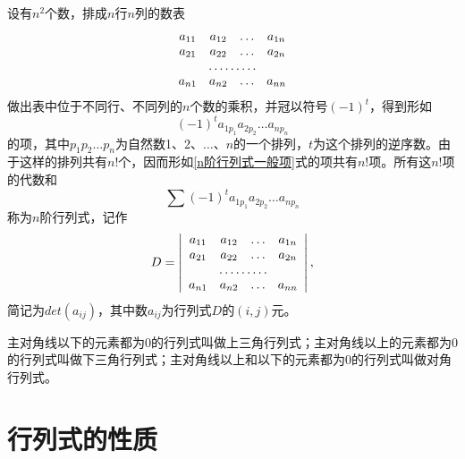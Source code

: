 \begin{定义}
	设有$ n^{2} $个数，排成$ n $行$ n $列的数表
	\begin{equation} \label{n阶数表}
		\begin{array}{cccc}
			a_{11} & a_{12} & \dots & a_{1n}\\
			a_{21} & a_{22} & \dots & a_{2n}\\
			\multicolumn{4}{c}{\dots\dots\dots}\\
			a_{n1} & a_{n2} & \dots & a_{nn}\\
		\end{array}
	\end{equation}
	做出表中位于不同行、不同列的$ n $个数的乘积，并冠以符号$ (-1)^{t} $，得到形如	
	\begin{equation}\label{n阶行列式一般项}
		(-1)^{t}a_{1p_{1}}a_{2p_{2}}\dots a_{np_{n}}
	\end{equation}
	\noindent 的项，其中$ p_{1}p_{2}\dots p_{n} $为自然数1、2、$ \dots $、$ n $的一个排列，$ t $为这个排列的逆序数。由于这样的排列共有$ n! $个，因而形如\ref{n阶行列式一般项}式的项共有$ n! $项。所有这$ n! $项的代数和	
	\begin{equation}
		\sum(-1)^{t}a_{1p_{1}}a_{2p_{2}}\dots a_{np_{n}}
	\end{equation}
	称为$ n $阶行列式，记作
	\begin{equation} \label{n阶行列式}
		D=\left |\begin{array}{cccc}
			a_{11} & a_{12} & \dots & a_{1n}\\
			a_{21} & a_{22} & \dots & a_{2n}\\
			\multicolumn{4}{c}{\dots\dots\dots}\\
			a_{n1} & a_{n2} & \dots & a_{nn}\\
		\end{array}\right |,
	\end{equation}
	简记为$ det(a_{ij}) $，其中数$ a_{ij} $为行列式$ D $的$ (i,j) $元。
\end{定义}

主对角线以下的元素都为0的行列式叫做上三角行列式；主对角线以上的元素都为0的行列式叫做下三角行列式；主对角线以上和以下的元素都为0的行列式叫做对角行列式。

\section{行列式的性质}

